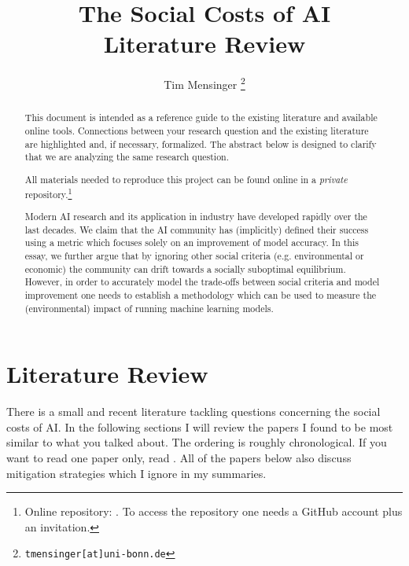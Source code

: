 \documentclass[a4paper, 12pt]{article}
\title{\textbf{The Social Costs of AI}\\
    \Large Literature Review
}
\date{}
\author{Tim Mensinger%
  \thanks{\texttt{tmensinger[at]uni-bonn.de}}
}
\affil{Bonn Graduate School of Economics}
\begin{document}
\onehalfspacing


\maketitle

\renewcommand{\abstractname}{Preamble}
\begin{abstract}
    \noindent This document is intended as a reference guide to the existing literature
    and available online tools. Connections between your research question and the
    existing literature are highlighted and, if necessary, formalized. The abstract
    below is designed to clarify that we are analyzing the same research question.

    All materials needed to reproduce this project can be found online in a
    \emph{private} repository.\footnote{Online repository:
    . To access the repository one
    needs a GitHub account plus an invitation.}
\end{abstract}

\renewcommand{\abstractname}{Abstract}
\begin{abstract}
    \noindent Modern AI research and its application in industry have developed rapidly
    over the last decades. We claim that the AI community has (implicitly) defined their
    success using a metric which focuses solely on an improvement of model accuracy. In
    this essay, we further argue that by ignoring other social criteria (e.g.
    environmental or economic) the community can drift towards a socially suboptimal
    equilibrium. However, in order to accurately model the trade-offs between social
    criteria and model improvement one needs to establish a methodology which can be
    used to measure the (environmental) impact of running machine learning models.
\end{abstract}
\thispagestyle{empty}

\newpage



\section{Literature Review}

There is a small and recent literature tackling questions concerning the social costs of
AI. In the following sections I will review the papers I found to be most similar to
what you talked about. The ordering is roughly chronological. If you want to read one
paper only, read . All of the papers below also discuss
mitigation strategies which I ignore in my summaries.
\end{document}
